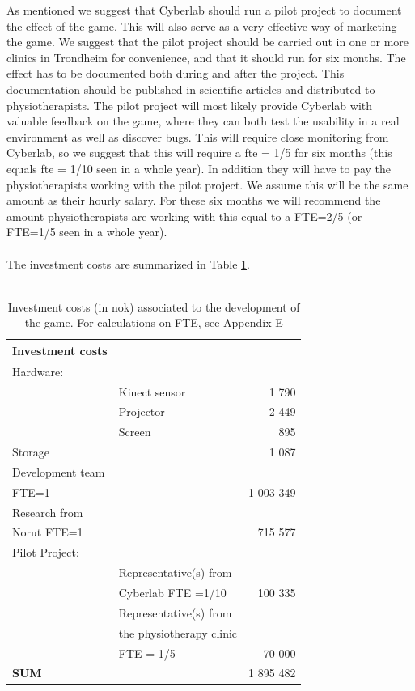 As mentioned we suggest that Cyberlab should run a pilot project to document the effect of the game. This will also serve as a very effective way of marketing the game. We suggest that the pilot project should be carried out in one or more clinics in Trondheim for convenience, and that it should run for six months. The effect has to be documented both during and after the project. This documentation should be published in scientific articles and distributed to physiotherapists. The pilot project will most likely provide Cyberlab with valuable feedback on the game, where they can both test the usability in a real environment as well as discover bugs. This will require close monitoring from Cyberlab, so we suggest that this will require a \ac{fte} = 1/5 for  six months (this equals \ac{fte} = 1/10 seen in a whole year). In addition they will have to pay the physiotherapists working with the pilot project. We assume this will be the same amount as their hourly salary. For these six months we will recommend the amount physiotherapists are working with this equal to a FTE=2/5 (or FTE=1/5 seen in a whole year).\\ \\
The investment costs are summarized in Table \ref{tab:investmentcosts}.\\ \\
\begin{table}
\centering
  \caption[Investment costs associated to the development of the game]{Investment costs (in \ac{nok}) associated to the development of the game. For calculations on FTE, see Appendix E}
    \begin{tabular}{|l|l|r|}
        \hline
       \textbf{Investment costs}  & &\\ \hline
       Hardware: & & \\ \hline
	   & Kinect sensor & 1 790  \\ \hline
	   & Projector & 2 449 \\ \hline
	   & Screen & 895 \\ \hline
	   Storage & & 1 087 \\ \hline
	   Development team & & \\  
	   FTE=1 &  & 1 003 349   \\ \hline
	   Research from & & \\ 
	   Norut FTE=1 & & 715 577 \\ \hline
	   Pilot Project: & & \\ \hline
	   & Representative(s) from & \\
	   & Cyberlab FTE =1/10 & 100 335  \\ \hline
	   & Representative(s) from & \\
	   & the physiotherapy clinic & \\
	   & FTE = 1/5 & 70 000  \\ \hline
	   \textbf{SUM} & & 1 895 482 
 \\ \hline
    \end{tabular}
    \label{tab:investmentcosts}
\end{table}
